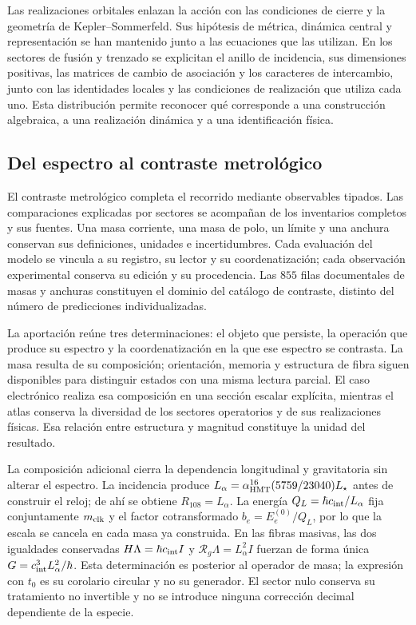 Las realizaciones orbitales enlazan la acción con las condiciones de
cierre y la geometría de Kepler--Sommerfeld. Sus hipótesis de métrica,
dinámica central y representación se han mantenido junto a las
ecuaciones que las utilizan. En los sectores de fusión y trenzado se
explicitan el anillo de incidencia, sus dimensiones positivas, las
matrices de cambio de asociación y los caracteres de intercambio,
junto con las identidades locales y las condiciones de realización
que utiliza cada uno. Esta distribución permite reconocer qué corresponde a
una construcción algebraica, a una realización dinámica y a una
identificación física.

\subsection{Del espectro al contraste metrológico}

El contraste metrológico completa el recorrido mediante observables
tipados. Las comparaciones explicadas por sectores se acompañan de
los inventarios completos y sus fuentes. Una masa corriente, una masa
de polo, un límite y una anchura conservan sus definiciones, unidades
e incertidumbres. Cada evaluación del modelo se vincula a su registro,
su lector y su coordenatización; cada observación experimental conserva su edición
y su procedencia. Las \(855\) filas documentales de masas y anchuras
constituyen el dominio del catálogo de contraste, distinto del número
de predicciones individualizadas.

La aportación reúne tres determinaciones: el objeto que persiste, la
operación que produce su espectro y la coordenatización en la que ese espectro se
contrasta. La masa resulta de su composición; orientación, memoria y
estructura de fibra siguen disponibles para distinguir estados con una
misma lectura parcial. El caso electrónico realiza esa composición en
una sección escalar explícita, mientras el atlas conserva la diversidad
de los sectores operatorios y de sus realizaciones físicas. Esa relación
entre estructura y magnitud constituye la unidad del resultado.

\par
La composición adicional cierra la dependencia longitudinal y
gravitatoria sin alterar el espectro. La incidencia produce
\(L_\alpha=\alpha_{\rm HMT}^{16}(5759/23040)L_\star\) antes de
construir el reloj; de ahí se obtiene \(R_{108}=L_\alpha\). La energía
\(Q_L=\hbar c_{\rm int}/L_\alpha\) fija conjuntamente
\(m_{\rm clk}\) y el factor cotransformado
\(b_e=E_e^{(0)}/Q_L\), por lo que la escala se cancela en cada masa ya
construida. En las fibras masivas, las dos igualdades conservadas
\(H\Lambda=\hbar c_{\rm int}I\) y
\(\mathcal R_g\Lambda=L_\alpha^2I\) fuerzan de forma única
\(G=c_{\rm int}^3L_\alpha^2/\hbar\). Esta determinación es posterior al
operador de masa; la expresión con \(t_0\) es su corolario circular y no
su generador. El sector nulo conserva su tratamiento no invertible y no
se introduce ninguna corrección decimal dependiente de la especie.
